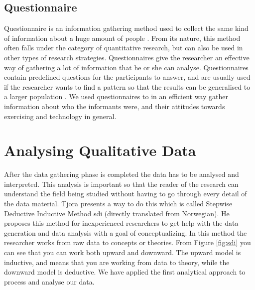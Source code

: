 \subsection{Questionnaire}
Questionnaire is an information gathering method used to collect  the same kind of information about a huge amount of people \cite{oates}. From its nature, this method often falls under the category of quantitative research, but can also be used in other types of research strategies. Questionnaires give the researcher an effective way of gathering a lot of information that he or she can analyse. Questionnaires contain predefined questions for the participants to answer, and are usually used if the researcher wants to find a pattern so that the results can be generalised to a larger population  \cite{oates}. We used questionnaires to in an efficient way gather information about  who the informants were, and their attitudes towards exercising and technology in general. 

\section{Analysing Qualitative Data}
After the data gathering phase is completed the data has to be analysed and interpreted. This analysis is important so that the reader of the research can understand the field being studied without having to go through every detail of the data material. Tjora \cite{tjora} presents a way to do this which is called Stepwise Deductive Inductive Method \ac{sdi} (directly translated from Norwegian). He proposes this method for inexperienced researchers to get help with the data generation and data analysis with a goal of conceptualizing. In this method the researcher works from raw data to concepts or theories. From Figure \ref{fig:sdi} you can see that you can work both upward and downward. The upward model is inductive, and means that you are working from data to theory, while the downward model is deductive. We have applied the first analytical approach to process and analyse our data.


